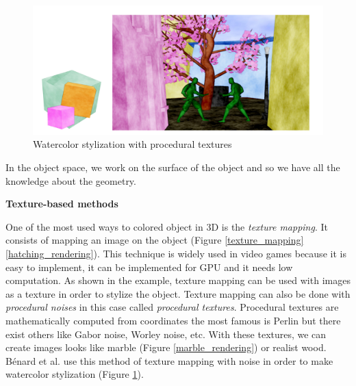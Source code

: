 \begin{figure}
    \begin{center}
    \includegraphics[scale=0.3]{pics/watercolor_objspace.png}
    \end{center}
    \caption{Watercolor stylization with procedural textures \cite{benard_dynamic_2009}}
    \label{watercolor_rendering}
\end{figure}





In the object space, we work on the surface of the object and so we have all the knowledge about the geometry. \newline


\textbf{Texture-based methods}


One of the most used ways to colored object in 3D is the \textit{texture mapping}. It consists of mapping an image on the object (Figure \ref{texture_mapping}\ref{hatching_rendering}). This technique is widely used in video games because it is easy to implement, it can be implemented for GPU and it needs low computation. As shown in the example, texture mapping can be used with images as a texture in order to stylize the object\cite{praun_real-time_2001, klein_non-photorealistic_2000, freudenberg_walk-through_2001}. Texture mapping can also be done with \textit{procedural noises}\cite{perlin_improving_2002} in this case called \textit{procedural textures}. Procedural textures are mathematically computed from coordinates the most famous is Perlin but there exist others like Gabor noise, Worley noise, etc. With these textures, we can create images looks like marble (Figure \ref{marble_rendering}) or realist wood. Bénard et al.\cite{benard_dynamic_2009, benard_dynamic_2010} use this method of texture mapping with noise in order to make watercolor stylization (Figure \ref{watercolor_rendering}). \newline

